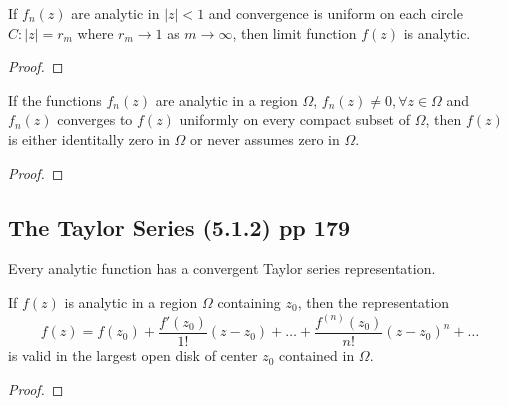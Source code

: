 \begin{remark}
	If $f_n(z)$ are analytic in $|z|<1$ and convergence is uniform on each circle $C : |z| = r_m$ where $r_m \to 1$ as $m \to \infty$, then limit function $f(z)$ is analytic.
\end{remark}
\begin{proof}
\end{proof}

\begin{theorem}[Hurwitz]
	If the functions $f_n(z)$ are analytic in a region $\Omega$, $f_n(z) \ne 0, \forall z \in \Omega$ and $f_n(z)$ converges to $f(z)$ uniformly on every compact subset of $\Omega$, then $f(z)$ is either identitally zero in $\Omega$ or never assumes zero in $\Omega$.
\end{theorem}
\begin{proof}
\end{proof}
	
\subsection{The Taylor Series (5.1.2) pp 179}
\begin{important}
	Every analytic function has a convergent Taylor series representation.
\end{important}
\begin{theorem}
	If $f(z)$ is analytic in a region $\Omega$ containing $z_0$, then the representation
	\begin{equation}
		f(z) = f(z_0) + \frac{f'(z_0)}{1!}(z-z_0) + \dots + \frac{f^{(n)}(z_0)}{n!}(z-z_0)^n + \dots
	\end{equation}
	is valid in the largest open disk of center $z_0$ contained in $\Omega$.
\end{theorem}
\begin{proof}
\end{proof}

